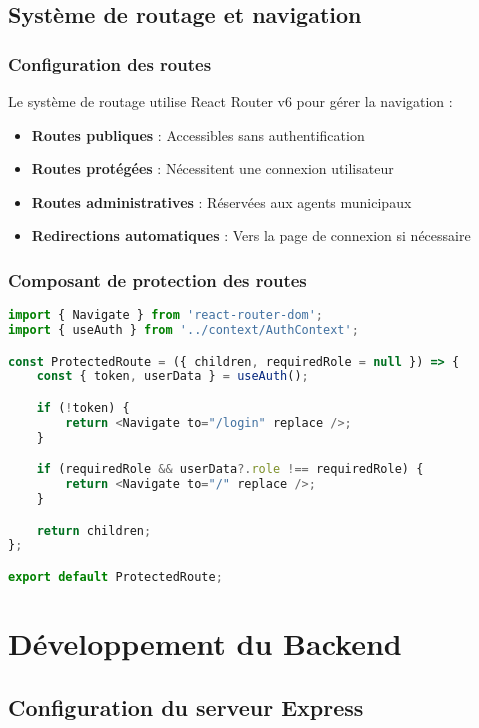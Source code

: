 \subsection{Système de routage et navigation}

\subsubsection{Configuration des routes}

Le système de routage utilise React Router v6 pour gérer la navigation :

\begin{itemize}
\item \textbf{Routes publiques} : Accessibles sans authentification
\item \textbf{Routes protégées} : Nécessitent une connexion utilisateur
\item \textbf{Routes administratives} : Réservées aux agents municipaux
\item \textbf{Redirections automatiques} : Vers la page de connexion si nécessaire
\end{itemize}

\subsubsection{Composant de protection des routes}

\begin{lstlisting}[language=JavaScript, caption=ProtectedRoute.jsx]
import { Navigate } from 'react-router-dom';
import { useAuth } from '../context/AuthContext';

const ProtectedRoute = ({ children, requiredRole = null }) => {
    const { token, userData } = useAuth();

    if (!token) {
        return <Navigate to="/login" replace />;
    }

    if (requiredRole && userData?.role !== requiredRole) {
        return <Navigate to="/" replace />;
    }

    return children;
};

export default ProtectedRoute;
\end{lstlisting}

\section{Développement du Backend}

\subsection{Configuration du serveur Express}

